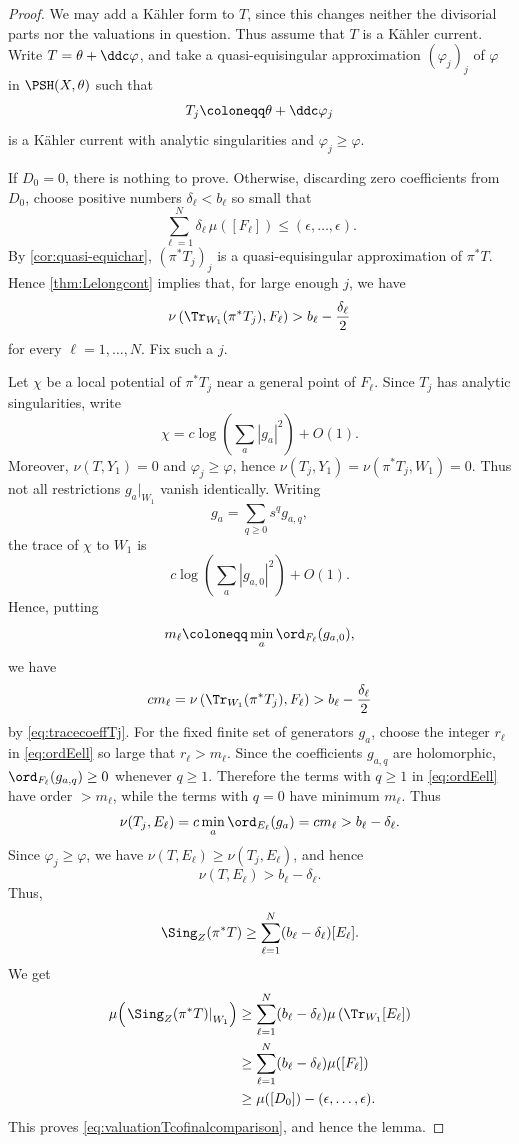 \begin{proof}
We may add a Kähler form to $T$, since this changes neither the divisorial parts nor the valuations in question. Thus assume that $T$ is a Kähler current. Write $T=\theta+\ddc\varphi$, and take a quasi-equisingular approximation $(\varphi_j)_j$ of $\varphi$ in
$\PSH(X,\theta)$ such that
\[
    T_j\coloneqq \theta+\ddc\varphi_j
\]
is a Kähler current with analytic singularities and $\varphi_j\geq\varphi$.

If $D_0=0$, there is nothing to prove. Otherwise, discarding zero coefficients from
$D_0$, choose positive numbers $\delta_\ell<b_\ell$ so small that
\[
    \sum_{\ell=1}^N \delta_\ell\,\mu([F_\ell]) \leq (\epsilon,\ldots,\epsilon).
\]
By \cref{cor:quasi-equichar}, $(\pi^*T_j)_j$ is a quasi-equisingular approximation of $\pi^*T$. Hence \cref{thm:Lelongcont} implies that, for large enough $j$, we have
\begin{equation}\label{eq:tracecoeffTj}
    \nu\left(\Tr_{W_1}(\pi^*T_j),F_\ell\right)> b_\ell-\frac{\delta_\ell}{2}
\end{equation}
for every $\ell=1,\ldots,N$. Fix such a $j$.



Let $\chi$ be a local potential of $\pi^*T_j$ near a general point of $F_\ell$. Since $T_j$ has analytic singularities, write
\[
    \chi=c\log\left(\sum_a |g_a|^2\right)+O(1).
\]
Moreover, $\nu(T,Y_1)=0$ and $\varphi_j\geq\varphi$, hence $\nu(T_j,Y_1)=\nu(\pi^*T_j,W_1)=0$. Thus not all restrictions $g_a|_{W_1}$ vanish identically. Writing
\[
    g_a=\sum_{q\geq 0}s^q g_{a,q},
\]
the trace of $\chi$ to $W_1$ is
\[
    c\log\left(\sum_a |g_{a,0}|^2\right)+O(1).
\]
Hence, putting
\[
    m_\ell\coloneqq \min_a\ord_{F_\ell}(g_{a,0}),
\]
we have
\[
    c m_\ell
    =
    \nu\left(\Tr_{W_1}(\pi^*T_j),F_\ell\right)
    >b_\ell-\frac{\delta_\ell}{2}
\]
by \eqref{eq:tracecoeffTj}. For the fixed finite set of generators $g_a$, choose the integer $r_\ell$ in \eqref{eq:ordEell} so large that $r_\ell>m_\ell$. Since the coefficients $g_{a,q}$ are holomorphic, $\ord_{F_\ell}(g_{a,q})\geq 0$ whenever $q\geq 1$. Therefore the terms with $q\geq 1$ in \eqref{eq:ordEell} have order $>m_\ell$, while the terms with $q=0$ have minimum $m_\ell$. Thus
\[
    \nu(T_j,E_\ell)
    =
    c\min_a\ord_{E_\ell}(g_a)
    =
    c m_\ell
    >b_\ell-\delta_\ell.
\]
Since $\varphi_j\geq\varphi$, we have $\nu(T,E_\ell)\geq\nu(T_j,E_\ell)$, and hence
\[
    \nu(T,E_\ell)>b_\ell-\delta_\ell.
\]
Thus,
\[
    \Sing_Z(\pi^*T)
    \geq
    \sum_{\ell=1}^N (b_\ell-\delta_\ell)[E_\ell].
\]
We get
\[
\begin{aligned}
    \mu\Bigl(\left.\Sing_Z(\pi^*T)\right|_{W_1}\Bigr)
    &\geq
    \sum_{\ell=1}^N
    (b_\ell-\delta_\ell)\mu\left(\Tr_{W_1}[E_\ell]\right)       \\
    &\geq
    \sum_{\ell=1}^N
    (b_\ell-\delta_\ell)\mu([F_\ell])                                \\
    &\geq
    \mu([D_0])-(\epsilon,\ldots,\epsilon).
\end{aligned}
\]
This proves \eqref{eq:valuationTcofinalcomparison}, and hence the lemma.
\end{proof}

